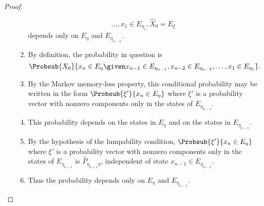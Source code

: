 \documentclass[12pt]{article}
\begin{document}
\begin{proof}
\begin{enumerate}
\begin{enumerate}
\[{                        \dots, x_1 \in E_{\eta_{1}}, \hat{X}_0 = E_\xi}
                    \] depends only on \( E_\eta \) and \( E_{\eta_{n-1}}
                    \).
                \item
                    By definition, the probability in question is
                    \[
                        \Probsub{X_0} {x_n \in E_\eta \given x_{n-1} \in
                        E_{\eta_{n-1}}, x_{n-2} \in E_{\eta_{n-2}},
                        \dots, x_1 \in E_{\eta_{1}}}.
                    \]
                \item
                    By the Markov memory-less property, this conditional
                    probability may be written in the form \( \Probsub{\xi'}
                    {x_n \in E_\eta} \) where \( \xi' \) is a
                    probability vector with nonzero components only in
                    the states of \( E_{\eta_{n-1}} \).
                \item
                    This probability depends on the states in \( E_{\eta}
                    \) and on the states in \( E_{\eta_{n-1}} \).
                \item
                    By the hypothesis of the lumpability condition, \(
                    \Probsub{\xi'}{x_n \in E_\eta} \) where \( \xi' \)
                    is a probability vector with nonzero components only
                    in the states of \( E_{\eta_{n-1}} \) is \( \hat{P}_
                    {\eta_{n-1} \eta} \), independent of state \( x_{n-1}
                    \in E_{\eta_{n-1}} \).
                \item
                    Thus the probability depends only on \( E_\eta \)
                    and \( E_{\eta_{n-1}} \).
            \end{enumerate}
    \end{enumerate}
\end{proof}
\end{document}
